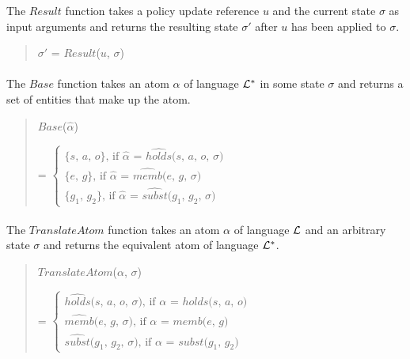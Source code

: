 \documentclass[10pt, twocolumn]{article}
\begin{document}
          The $Result$ function takes a policy update reference $u$ and the
          current state $\sigma$ as input arguments and returns the resulting
          state $\sigma'$ after $u$ has been applied to $\sigma$.
 
          \begin{quote}
            $\sigma'$ = $Result$($u$, $\sigma$)
          \end{quote}

        \paragraph{}

          The $Base$ function takes an atom $\hat{\alpha}$ of language
          ${\cal L}^{*}$ in some state $\sigma$ and returns a set of
          entities that make up the atom.

          \begin{quote}
            $Base$($\hat{\alpha}$)
 
            = 
            \begin{math}
              \begin{cases}
                \mbox{\{$s$, $a$, $o$\}, if $\hat{\alpha}$ = $\hat{holds}$($s$, $a$, $o$, $\sigma$)} \\
                \mbox{\{$e$, $g$\}, if $\hat{\alpha}$ = $\hat{memb}$($e$, $g$, $\sigma$)} \\
                \mbox{\{$g_{1}$, $g_{2}$\}, if $\hat{\alpha}$ = $\hat{subst}$($g_{1}$, $g_{2}$, $\sigma$)}
              \end{cases}
            \end{math}
          \end{quote}

        \paragraph{}

          The $TranslateAtom$ function takes an atom $\alpha$ of language
          ${\cal L}$ and an arbitrary state $\sigma$ and returns the equivalent
          atom of language ${\cal L}^{*}$.
 
          \begin{quote}
            $TranslateAtom$($\alpha$, $\sigma$)
 
            = 
            \begin{math}
              \begin{cases}
                \mbox{$\hat{holds}$($s$, $a$, $o$, $\sigma$), if $\alpha$ = $holds$($s$, $a$, $o$)} \\
                \mbox{$\hat{memb}$($e$, $g$, $\sigma$), if $\alpha$ = $memb$($e$, $g$)} \\
                \mbox{$\hat{subst}$($g_{1}$, $g_{2}$, $\sigma$), if $\alpha$ = $subst$($g_{1}$, $g_{2}$)}
              \end{cases}
            \end{math}
          \end{quote}
\end{document}
